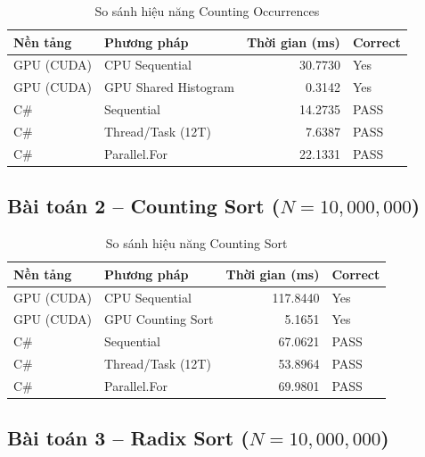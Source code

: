 \documentclass[12pt,a4paper]{article}
\begin{document}
\begin{table}[H]
\centering
\caption{So sánh hiệu năng Counting Occurrences}
\begin{tabular}{llrl}
\toprule
\textbf{Nền tảng} & \textbf{Phương pháp} & \textbf{Thời gian (ms)} & \textbf{Correct} \\
\midrule
GPU (CUDA)   & CPU Sequential          & 30.7730 & Yes \\
GPU (CUDA)   & GPU Shared Histogram    & 0.3142  & Yes \\
\midrule
C\#          & Sequential              & 14.2735 & PASS \\
C\#          & Thread/Task (12T)       & 7.6387  & PASS \\
C\#          & Parallel.For            & 22.1331 & PASS \\
\bottomrule
\end{tabular}
\end{table}

\subsection{Bài toán 2 -- Counting Sort ($N = 10{,}000{,}000$)}

\begin{table}[H]
\centering
\caption{So sánh hiệu năng Counting Sort}
\begin{tabular}{llrl}
\toprule
\textbf{Nền tảng} & \textbf{Phương pháp} & \textbf{Thời gian (ms)} & \textbf{Correct} \\
\midrule
GPU (CUDA)   & CPU Sequential          & 117.8440 & Yes \\
GPU (CUDA)   & GPU Counting Sort       & 5.1651   & Yes \\
\midrule
C\#          & Sequential              & 67.0621 & PASS \\
C\#          & Thread/Task (12T)       & 53.8964 & PASS \\
C\#          & Parallel.For            & 69.9801 & PASS \\
\bottomrule
\end{tabular}
\end{table}

\subsection{Bài toán 3 -- Radix Sort ($N = 10{,}000{,}000$)}
\end{document}
